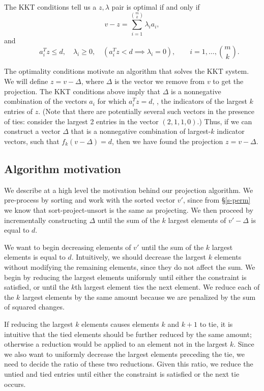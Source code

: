 \documentclass[12pt]{article}
\begin{document}
The KKT conditions tell us a $z, \lambda$ pair is optimal if and only if 
\[
    v-z = \sum_{i=1}^{\binom{m}{k}} \lambda_i a_i,
\] 
and
\[
    \qquad a_i^Tz \leq d, \quad \lambda_i \geq 0, 
    \quad \left(a_i^Tz < d \implies \lambda_i = 0\right), \qquad i=1,\ldots,\binom{m}{k}.
\]

The optimality conditions motivate an algorithm that solves the KKT
system. We will define $z = v-\Delta$, where $\Delta$ is the vector we remove
from $v$ to get the projection. The KKT conditions above imply that
$\Delta$ is a nonnegative combination of the vectors $a_i$ for which
$a_i^Tz=d$, \ie, the indicators of the largest $k$ entries of $z$. (Note
that there are potentially several such vectors in the presence of ties: consider the
largest 2 entries in the vector $(2,1,1,0)$.)
Thus, if we can construct a vector $\Delta$ that is a nonnegative combination of
largest-$k$ indicator vectors, such that $f_k(v-\Delta) = d$, 
then we have found the projection $z= v-\Delta$.

\subsection{Algorithm motivation}
We describe at a high level the motivation behind our projection algorithm.
We pre-process by sorting and work with the sorted vector $v'$, since from
\S\ref{s-perm} we know that sort-project-unsort is the same as projecting. We then proceed
by incrementally constructing $\Delta$ until the sum of the $k$ largest elements
of $v'-\Delta$ is equal to $d$.

We want to begin decreasing elements of $v'$ until the sum of the $k$ largest
elements is equal to $d$. Intuitively, we should decrease the largest $k$
elements without modifying the remaining elements, since they do not affect the sum.
We begin by reducing the largest elements uniformly until either the constraint is
satisfied, or until the $k$th largest element ties the next element. 
We reduce each of the $k$ largest elements by the same amount because we are
penalized by the sum of squared changes.

If reducing the largest $k$ elements causes elements $k$ and $k+1$ to tie, it is
intuitive that the tied elements should be further reduced by the same amount;
otherwise a reduction would be applied to an element not in the largest $k$. 
Since we also want to uniformly decrease the largest elements preceding the tie,
we need to decide the ratio of these two reductions. Given this ratio, we reduce
the untied and tied entries until either the constraint is satisfied or the next
tie occurs.
\end{document}
